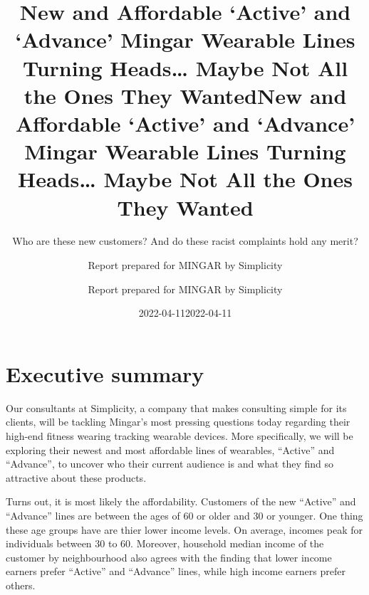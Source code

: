 \documentclass[
          english,
          paper=a4,
              ,captions=tableheading
  ]{scrartcl}
\title{New and Affordable `Active' and `Advance' Mingar Wearable Lines
Turning Heads\ldots{} Maybe Not All the Ones They Wanted}
\subtitle{Who are these new customers? And do these racist complaints
hold any merit?}
\author{Report prepared for MINGAR by Simplicity}
\date{2022-04-11}
\title{New and Affordable `Active' and `Advance' Mingar Wearable Lines
Turning Heads\ldots{} Maybe Not All the Ones They Wanted}
\author{Report prepared for MINGAR by Simplicity}
\date{2022-04-11}
\begin{document}
\begin{titlepage}
\afterpage{\restorepagecolor}
\newcommand{\colorRule}[3][black]{\textcolor[HTML]{#1}{\rule{#2}{#3}}}
\end{titlepage}
\restoregeometry




{
\setcounter{tocdepth}{2}
\tableofcontents
}
\newpage

\hypertarget{executive-summary}{%
\section{Executive summary}\label{executive-summary}}

Our consultants at Simplicity, a company that makes consulting simple
for its clients, will be tackling Mingar's most pressing questions today
regarding their high-end fitness wearing tracking wearable devices. More
specifically, we will be exploring their newest and most affordable
lines of wearables, ``Active'' and ``Advance'', to uncover who their
current audience is and what they find so attractive about these
products.

Turns out, it is most likely the affordability. Customers of the new
``Active'' and ``Advance'' lines are between the ages of 60 or older and
30 or younger. One thing these age groups have are thier lower income
levels. On average, incomes peak for individuals between 30 to 60.
Moreover, household median income of the customer by neighbourhood also
agrees with the finding that lower income earners prefer ``Active'' and
``Advance'' lines, while high income earners prefer others.
\end{document}
